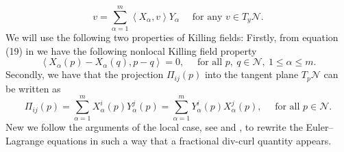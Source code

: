 \documentclass[12pt]{amsart}
\def\n{{\mathcal N}}
\theoremstyle{definition}
\numberwithin{theorem}{section} \numberwithin{equation}{section}
\begin{document}
\[
 v = \sum_{\alpha=1}^m \left\langle X_\alpha, v\right\rangle Y_\alpha \quad  \text{ for any } v\in T_y\n.
\]
We will use the following two properties of Killing fields: Firstly, from equation (19) in \cite{Schikorra-Sire-Wang-2015} we have the following nonlocal Killing field property
\begin{equation}\label{eq:killingprop}
\left\langle X_\alpha(p) - X_\alpha(q),p-q\right\rangle =0, \quad \text{ for all } p,\ q\in\n,\ 1\le\alpha\le m.
\end{equation}
Secondly, we have that the projection $\Pi_{ij}(p)$ into the tangent plane $T_p \mathcal{N}$ can be written as
\begin{equation}\label{eq:killingprojection}
 \Pi_{ij}(p) = \sum_{\alpha=1}^m X^i_\alpha(p)Y^j_\alpha(p) = \sum_{\alpha=1}^m Y_\alpha^i(p)X^j_\alpha(p),\quad \text{ for all } p\in\n.
\end{equation}
% 
New we follow the arguments of the local case, see \cite{Helein91-sym} and \cite[pp.90--91]{Toro-Wang}, to rewrite the Euler--Lagrange equations in such a way that a fractional div-curl quantity appears.  
% 
\end{document}
